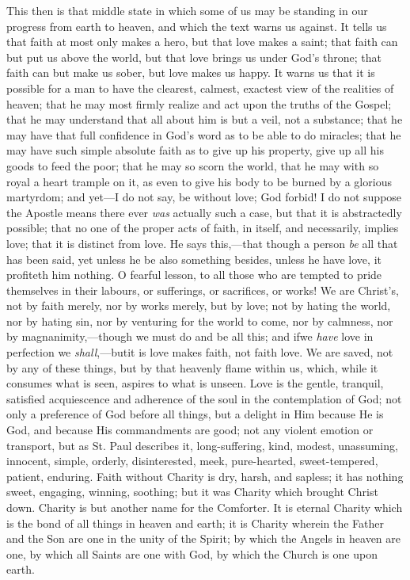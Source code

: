 This then is that middle state in which some of us may be standing
in our progress from earth to heaven, and which the text warns us
against. It tells us that faith at most only makes a hero, but that
love makes a saint; that faith can but put us above the world, but
that love brings us under God's throne; that faith can but make us
sober, but love makes us happy. It warns us that it is possible for a
man to have the clearest, calmest, exactest view of the realities of
heaven; that he may most firmly realize and act upon the truths of the
Gospel; that he may understand that all about him is but a veil, not a
substance; that he may have that full confidence in God's word as to
be able to do miracles; that he may have such simple absolute faith as
to give up his property, give up all his goods to feed the poor; that
he may so scorn the world, that he may with so royal a heart trample
on it, as even to give his body to be burned by a glorious martyrdom;
and yet—I do not say, be without love; God forbid! I do not suppose
the Apostle means there ever \emph{was} actually such a case, but that
it is abstractedly possible; that no one of the proper acts of faith,
in itself, and necessarily, implies love; that it is distinct from
love. He says this,—that though a person \emph{be} all that has been
said, yet unless he be also something besides, unless he have love, it
profiteth him nothing. O fearful lesson, to all those who are tempted
to pride themselves in their labours, or sufferings, or sacrifices, or
works! We are Christ's, not by faith merely, nor by works merely,
but by love; not by hating the world, nor by hating sin, nor by
venturing for the world to come, nor by calmness, nor by magnanimity,—though
we must do and be all this; and if\emph{}we \emph{have} love in
perfection we \emph{shall},—but\emph{}it is love makes faith, not
faith love. We are saved, not by any of these things, but by that
heavenly flame within us, which, while it consumes what is seen,
aspires to what is unseen. Love is the gentle, tranquil, satisfied
acquiescence and adherence of the soul in the contemplation of God;
not only a preference of God before all things, but a delight in Him
because He is God, and because His commandments are good; not any
violent emotion or transport, but as St. Paul describes it,
long-suffering, kind, modest, unassuming, innocent, simple, orderly,
disinterested, meek, pure-hearted, sweet-tempered, patient, enduring.
Faith without Charity is dry, harsh, and sapless; it has nothing
sweet, engaging, winning, soothing; but it was Charity which brought
Christ down. Charity is but another name for the Comforter. It is
eternal Charity which is the bond of all things in heaven and earth;
it is Charity wherein the Father and the Son are one in the unity of
the Spirit; by which the Angels in heaven are one, by which all Saints
are one with God, by which the Church is one upon earth.

